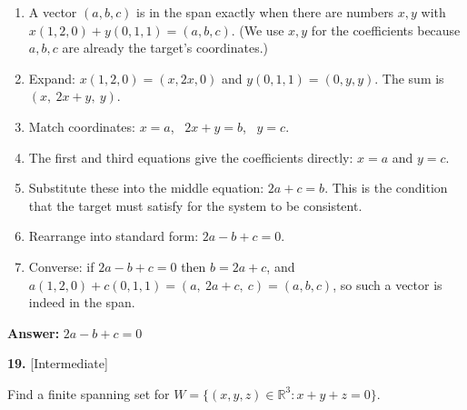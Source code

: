 \documentclass[11pt]{article}
\begin{document}
\begin{tcolorbox}[breakable,colback=ans,colframe=ansb,boxrule=0.5pt,left=4pt,right=4pt,top=2pt,bottom=2pt]\begin{enumerate}[leftmargin=2.2em,itemsep=1pt,topsep=1pt,label=\textbf{Step \arabic*.}]\item A vector $(a,b,c)$ is in the span exactly when there are numbers $x,y$ with $x(1,2,0)+y(0,1,1)=(a,b,c)$. (We use $x,y$ for the coefficients because $a,b,c$ are already the target's coordinates.)
\item Expand: $x(1,2,0)=(x,2x,0)$ and $y(0,1,1)=(0,y,y)$. The sum is $(x,\ 2x+y,\ y)$.
\item Match coordinates: $x=a$, \ $2x+y=b$, \ $y=c$.
\item The first and third equations give the coefficients directly: $x=a$ and $y=c$.
\item Substitute these into the middle equation: $2a+c=b$. This is the condition that the target must satisfy for the system to be consistent.
\item Rearrange into standard form: $2a-b+c=0$.
\item Converse: if $2a-b+c=0$ then $b=2a+c$, and $a(1,2,0)+c(0,1,1)=(a,\ 2a+c,\ c)=(a,b,c)$, so such a vector is indeed in the span.
\end{enumerate}\textbf{Answer:} $2a-b+c=0$\end{tcolorbox}
\par\vspace{2pt}
\begin{minipage}{\linewidth}\textbf{19.} \hfill{\scriptsize\color{ink}[Intermediate]}\par\nopagebreak Find a finite spanning set for $W=\{(x,y,z)\in\mathbb{R}^{3}:x+y+z=0\}$.
\end{minipage}\par\nopagebreak
\end{document}
